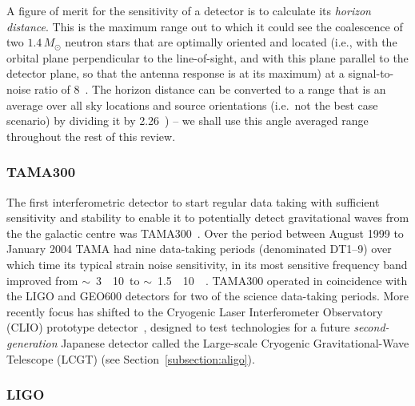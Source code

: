 A figure of merit for the sensitivity of a detector is to calculate
its \textit{horizon distance}. This is the maximum range out to which
it could see the coalescence of two $1.4\,M_{\odot}$ neutron stars
that are optimally oriented and located (i.e., with the orbital plane
perpendicular to the line-of-sight, and with this plane parallel to
the detector plane, so that the antenna response is at its maximum) at
a signal-to-noise ratio of 8~\cite{Abbott:2005b}. The horizon distance
can be converted to a range that is an average over all sky locations
and source orientations (i.e.\, not the best case scenario) by dividing
it by 2.26~\cite{Sutton:2003}) -- we shall use this angle averaged
range throughout the rest of this review.


\subsubsection{TAMA300}


The first interferometric detector to start regular data taking with sufficient
sensitivity and stability to enable it to potentially detect gravitational waves
from the the galactic centre was TAMA300~\cite{Ando:2001}. Over the period
between August 1999 to January 2004 TAMA had nine data-taking periods
(denominated DT1--9) over which time its typical strain noise sensitivity, in
its most sensitive frequency band improved from
$\sim$~3~\texttimes~10~\Hz to
$\sim$~1.5~\texttimes~10~\Hz~\cite{Akutsu:2006}. TAMA300
operated in coincidence with the LIGO and GEO600 detectors for two of
the science data-taking periods. More recently focus has shifted to
the Cryogenic Laser Interferometer Observatory (CLIO) prototype
detector~\cite{Yamamoto:2008, CLIOweb}, designed to test technologies
for a future \textit{second-generation} Japanese detector called the
Large-scale Cryogenic Gravitational-Wave Telescope (LCGT) (see
Section~\ref{subsection:aligo}).


\subsubsection{LIGO}
\label{sec:ligoruns} 

